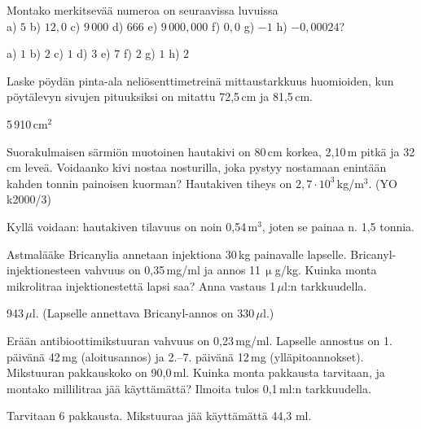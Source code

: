 \begin{tehtavasivu}
\begin{tehtava}
Montako merkitsevää numeroa on seuraavissa luvuissa \\
a) $5$ \qquad
b) $12,0$ \qquad
c) $9\,000$ \qquad
d) $666$ \qquad
e) $9\,000,000$ \qquad
f) $0,0$ \qquad
g) $-1$ \qquad
h) $-0,00024$?
\begin{vastaus}
a) $1$ \qquad
b) $2$ \qquad
c) $1$ \qquad
d) $3$ \qquad
e) $7$ \qquad
f) $2$ \qquad
g) $1$ \qquad
h) $2$
\end{vastaus}
\end{tehtava}


\begin{tehtava}
Laske pöydän pinta-ala neliösenttimetreinä mittaustarkkuus huomioiden, kun pöytälevyn sivujen pituuksiksi on mitattu 72,5\,cm ja 81,5\,cm.
\begin{vastaus}
5\,910\,cm$^2$
\end{vastaus}
\end{tehtava}

\begin{tehtava}
Suorakulmaisen särmiön muotoinen hautakivi on 80\,cm korkea, 2,10\,m pitkä ja 32\,cm leveä.
Voidaanko kivi nostaa nosturilla, joka pystyy nostamaan enintään kahden tonnin painoisen kuorman? Hautakiven tiheys on $2,7 \cdot 10^3$\,kg/m$^3$. (YO k2000/3)
\begin{vastaus}
Kyllä voidaan: hautakiven tilavuus on noin 0,54\,m$^3$, joten se painaa n. 1,5 tonnia.
\end{vastaus}
\end{tehtava}

\begin{tehtava}
Astmalääke Bricanylia annetaan injektiona 30\,kg painavalle lapselle. Bricanyl-injektionesteen vahvuus on 0,35\,mg/ml ja annos 11\,$\upmu$g/kg. Kuinka monta mikrolitraa injektionestettä lapsi saa? Anna vastaus 1\,$\mu$l:n tarkkuudella.
 \begin{vastaus}
943\,$\mu$l. (Lapselle annettava Bricanyl-annos on 330\,$\mu$l.)
 \end{vastaus}
\end{tehtava}

\begin{tehtava}
Erään antibioottimikstuuran vahvuus on 0,23\,mg/ml. Lapselle annostus on 1. päivänä 42\,mg (aloitusannos) 
ja 2.--7. päivänä 12\,mg (ylläpitoannokset). Mikstuuran pakkauskoko on 90,0\,ml. Kuinka monta pakkausta tarvitaan, ja montako millilitraa jää käyttämättä? Ilmoita tulos 0,1\,ml:n tarkkuudella.
 \begin{vastaus}
Tarvitaan 6 pakkausta. Mikstuuraa jää käyttämättä 44,3 ml.
 \end{vastaus}
\end{tehtava}


\end{tehtavasivu}

